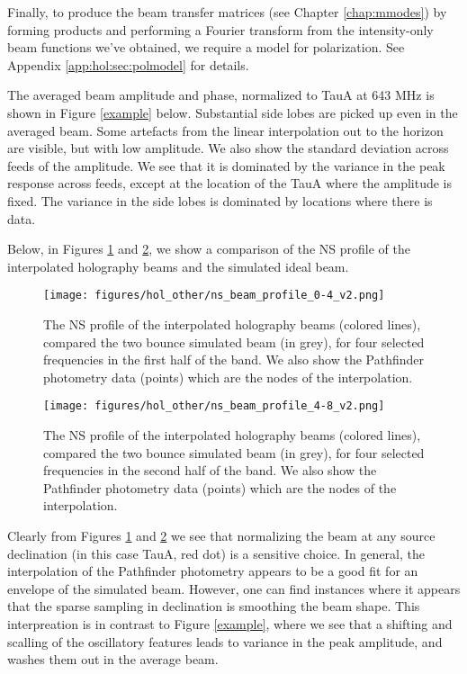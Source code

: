 Finally, to produce the beam transfer matrices (see Chapter \ref{chap:mmodes}) by forming products and performing a Fourier transform from the intensity-only beam functions we've obtained, we require a model for polarization. See Appendix \ref{app:hol:sec:polmodel} for details.

The averaged beam amplitude and phase, normalized to TauA at 643 MHz is shown in Figure \ref{example} below. Substantial side lobes are picked up even in the averaged beam. Some artefacts from the linear interpolation out to the horizon are visible, but with low amplitude. We also show the standard deviation across feeds of the amplitude. We see that it is dominated by the variance in the peak response across feeds, except at the location of the TauA where the amplitude is fixed. The variance in the side lobes is dominated by locations where there is data.

Below, in Figures \ref{nsprof0} and \ref{nsprof1}, we show a comparison of the NS profile of the interpolated holography beams and the simulated ideal beam.

\begin{figure}[h!]
\begin{center}
\texttt{[image: figures/hol\_other/ns\_beam\_profile\_0-4\_v2.png]}
\caption{The NS profile of the interpolated holography beams (colored lines), compared the two bounce simulated beam (in grey), for four selected frequencies in the first half of the band. We also show the Pathfinder photometry data (points) which are the nodes of the interpolation. \label{nsprof0}}
\end{center}
\end{figure}

\begin{figure}[h!]
\begin{center}
\texttt{[image: figures/hol\_other/ns\_beam\_profile\_4-8\_v2.png]}
\caption{The NS profile of the interpolated holography beams (colored lines), compared the two bounce simulated beam (in grey), for four selected frequencies in the second half of the band. We also show the Pathfinder photometry data (points) which are the nodes of the interpolation. \label{nsprof1}}
\end{center}
\end{figure}

Clearly from Figures \ref{nsprof0} and \ref{nsprof1} we see that normalizing the beam at any source declination (in this case TauA, red dot) is a sensitive choice. In general, the interpolation of the Pathfinder photometry appears to be a good fit for an envelope of the simulated beam. However, one can find instances where it appears that the sparse sampling in declination is smoothing the beam shape. This interpreation is in contrast to Figure \ref{example}, where we see that a shifting and scalling of the oscillatory features leads to variance in the peak amplitude, and washes them out in the average beam.

